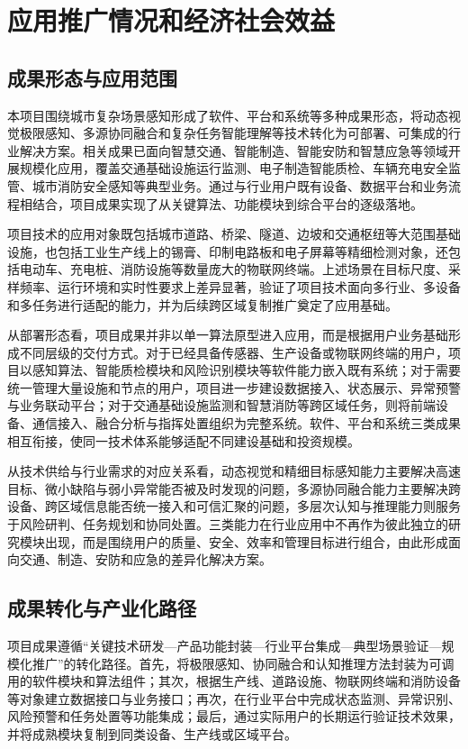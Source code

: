 \section{应用推广情况和经济社会效益}

\subsection{成果形态与应用范围}

本项目围绕城市复杂场景感知形成了软件、平台和系统等多种成果形态，将动态视觉极限感知、多源协同融合和复杂任务智能理解等技术转化为可部署、可集成的行业解决方案。相关成果已面向智慧交通、智能制造、智能安防和智慧应急等领域开展规模化应用，覆盖交通基础设施运行监测、电子制造智能质检、车辆充电安全监管、城市消防安全感知等典型业务。通过与行业用户既有设备、数据平台和业务流程相结合，项目成果实现了从关键算法、功能模块到综合平台的逐级落地。

项目技术的应用对象既包括城市道路、桥梁、隧道、边坡和交通枢纽等大范围基础设施，也包括工业生产线上的锡膏、印制电路板和电子屏幕等精细检测对象，还包括电动车、充电桩、消防设施等数量庞大的物联网终端。上述场景在目标尺度、采样频率、运行环境和实时性要求上差异显著，验证了项目技术面向多行业、多设备和多任务进行适配的能力，并为后续跨区域复制推广奠定了应用基础。

从部署形态看，项目成果并非以单一算法原型进入应用，而是根据用户业务基础形成不同层级的交付方式。对于已经具备传感器、生产设备或物联网终端的用户，项目以感知算法、智能质检模块和风险识别模块等软件能力嵌入既有系统；对于需要统一管理大量设施和节点的用户，项目进一步建设数据接入、状态展示、异常预警与业务联动平台；对于交通基础设施监测和智慧消防等跨区域任务，则将前端设备、通信接入、融合分析与指挥处置组织为完整系统。软件、平台和系统三类成果相互衔接，使同一技术体系能够适配不同建设基础和投资规模。

从技术供给与行业需求的对应关系看，动态视觉和精细目标感知能力主要解决高速目标、微小缺陷与弱小异常能否被及时发现的问题，多源协同融合能力主要解决跨设备、跨区域信息能否统一接入和可信汇聚的问题，多层次认知与推理能力则服务于风险研判、任务规划和协同处置。三类能力在行业应用中不再作为彼此独立的研究模块出现，而是围绕用户的质量、安全、效率和管理目标进行组合，由此形成面向交通、制造、安防和应急的差异化解决方案。

\subsection{成果转化与产业化路径}

项目成果遵循“关键技术研发---产品功能封装---行业平台集成---典型场景验证---规模化推广”的转化路径。首先，将极限感知、协同融合和认知推理方法封装为可调用的软件模块和算法组件；其次，根据生产线、道路设施、物联网终端和消防设备等对象建立数据接口与业务接口；再次，在行业平台中完成状态监测、异常识别、风险预警和任务处置等功能集成；最后，通过实际用户的长期运行验证技术效果，并将成熟模块复制到同类设备、生产线或区域平台。


